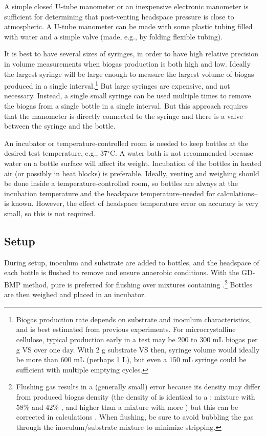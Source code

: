 \documentclass[]{article}
\begin{document}
A simple closed U-tube manometer or an inexpensive electronic manometer is sufficient for determining that post-venting headspace pressure is close to atmospheric.
A U-tube manometer can be made with some plastic tubing filled with water and a simple valve (made, e.g., by folding flexible tubing).

It is best to have several sizes of syringes, in order to have high relative precision in volume measurements when biogas production is both high and low.
Ideally the largest syringe will be large enough to measure the largest volume of biogas produced in a single interval.\footnote{
  Biogas production rate depends on substrate and inoculum characteristics, and is best estimated from previous experiments.
  For microcrystalline cellulose, typical production early in a test may be 200 to 300 mL biogas per g VS over one day. 
  With 2 g substrate VS then, syringe volume would ideally be more than 600 mL (perhaps 1 L), but even a 150 mL syringe could be sufficient with multiple emptying cycles.
}
But large syringes are expensive, and not necessary.
Instead, a single small syringe can be used multiple times to remove the biogas from a single bottle in a single interval.
But this approach requires that the manometer is directly connected to the syringe and there is a valve between the syringe and the bottle.

An incubator or temperature-controlled room is needed to keep bottles at the desired test temperature, e.g., 37$^\circ$C.
A water bath is not recommended because water on a bottle surface will affect its weight.
Incubation of the bottles in heated air (or possibly in heat blocks) is preferable.
Ideally, venting and weighing should be done inside a temperature-controlled room, so bottles are always at the incubation temperature and the headspace temperature--needed for calculations--is known.  
However, the effect of headspace temperature error on accuracy is very small, so this is not required.

\subsection{Setup}
During setup, inoculum and substrate are added to bottles, and the headspace of each bottle is flushed to remove  and ensure anaerobic conditions. 
With the GD-BMP method, pure  is preferred for flushing over mixtures containing .\footnote{
  Flushing gas results in a (generally small) error because its density may differ from produced biogas density (the density of  is identical to a : mixture with 58\%  and 42\% , and higher than a mixture with more ) but this can be corrected in calculations \citep{justesenDevelopmentValidationLowcost2019}. 
When flushing, be sure to avoid bubbling the gas through the inoculum/substrate mixture to minimize  stripping.
}
Bottles are then weighed and placed in an incubator.
\end{document}

